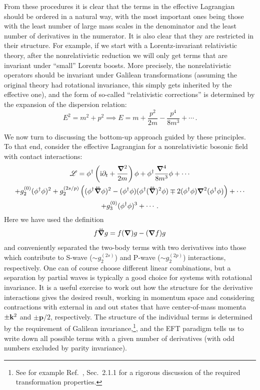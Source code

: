 From these procedures it is clear that the terms in the effective Lagrangian 
should be ordered in a natural way, with the most important ones being those 
with the least number of large mass scales in the denominator and the least 
number of derivatives in the numerator.  It is also clear that they are 
restricted in their structure.  For example, if we start with a 
Lorentz-invariant relativistic theory, after the nonrelativistic reduction we 
will only get terms that are invariant under ``small'' Lorentz boosts.  More 
precisely, the nonrelativistic operators should be invariant under Galilean 
transformations (assuming the original theory had rotational invariance, this 
simply gets inherited by the effective one), and the form of so-called 
``relativistic corrections'' is determined by the expansion of the dispersion 
relation:
%
\begin{equation}
 E^2 = m^2 + p^2
 \implies E = m + \frac{p^2}{2m} - \frac{p^4}{8m^3} + \cdots \,.
\end{equation}

We now turn to discussing the bottom-up approach guided by these principles.  
To that end, consider the effective Lagrangian for a nonrelativistic bosonic 
field with contact interactions:
%
\begin{multline}
 \LL = \phi^\dagger \left(\ii\partial_t + \frac{\Laplace}{2m}\right)\phi
 + \phi^\dagger \frac{\vNabla^4}{8m^3} \phi + \cdots \\
 + g_{2}^{(0)} (\phi^\dagger \phi)^2
 + g_{2}^{(2s/p)} \left(
  (\phi^\dagger\vNablaLR\phi)^2
   - (\phi^\dagger\phi)(\phi^\dagger(\vNablaLR)^2\phi)
   \mp 2 (\phi^\dagger\phi)\vNabla^2(\phi^\dagger\phi)
  \right) + \cdots \\
 + g_{3}^{(0)} (\phi^\dagger \phi)^3 + \cdots \,.
\label{eq:L-phi-generic}
\end{multline}
%
Here we have used the definition
%
\begin{equation}
 f \vNablaLR g = f(\vNabla)g - (\vNabla f)g
\end{equation}
%
and conveniently separated the two-body terms with two derivatives into 
those which contribute to S-wave ($\sim g_{2}^{(2s)}$) and P-wave ($\sim 
g_{2}^{(2p)}$) interactions, respectively.  One can of course choose different 
linear combinations, but a separation by partial waves is typically a good 
choice for systems with rotational invariance.  It is a useful exercise to work 
out how the structure for the derivative interactions gives the desired result, 
working in momentum space and considering contractions with external in and out 
states that have center-of-mass momenta $\pm\mathbf{k}^2$ and $\pm{\mathbf{p}}/2$, respectively.
The structure of the individual terms is determined by the requirement of 
Galilean invariance,\footnote{See for example Ref.~\cite{Hagen:2014}, 
Sec.~2.1.1 for a rigorous discussion of the required transformation 
properties.}, and the EFT paradigm tells us to write down all possible terms 
with a given number of derivatives (with odd numbers excluded by parity 
invariance).

